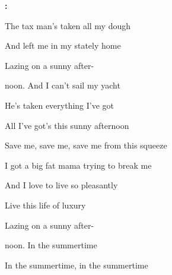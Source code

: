 \begin{song}



\begin{chordbox}
\end{chordbox}

\large

\bigskip

\Intro\textbf{:}     \par

\bigskip

The tax man's taken all my dough \par
And left me in my stately home \par
{}Lazing on a sunny after- \par
{}noon. And I can't sail my yacht \par
He's taken everything I've got \par
{}All I've got's this sunny afternoon \par

\bigskip

Save me, save me, save me from this squeeze \par
I got a big fat mama trying to break me  \par

\bigskip

\begin{chorusbox}{\Chorus}
And I love to live so pleasantly \par
{}Live this life of luxury  \par
{}Lazing on a sunny after- \par
{}noon. In the summertime \par
In the summertime, in the summertime \par
\end{chorusbox}


\end{song}
